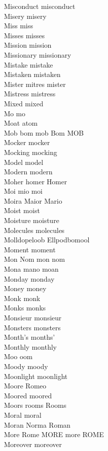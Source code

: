 Misconduct misconduct\\
Misery misery\\
Miss miss\\
Misses misses\\
Mission mission\\
Missionary missionary\\
Mistake mistake\\
Mistaken mistaken\\
Mister mitres mister\\
Mistress mistress\\
Mixed mixed\\
Mo mo\\
Moat atom\\
Mob bom mob Bom MOB\\
Mocker mocker\\
Mocking mocking\\
Model model\\
Modern modern\\
Moher homer Homer\\
Moi mio moi\\
Moira Maior Mario\\
Moist moist\\
Moisture moisture\\
Molecules molecules\\
Molldopeloob Ellpodbomool\\
Moment moment\\
Mon Nom mon nom\\
Mona mano moan\\
Monday monday\\
Money money\\
Monk monk\\
Monks monks\\
Monsieur monsieur\\
Monsters monsters\\
Month's months'\\
Monthly monthly\\
Moo oom\\
Moody moody\\
Moonlight moonlight\\
Moore Romeo\\
Moored moored\\
Moors rooms Rooms\\
Moral moral\\
Moran Norma Roman\\
More Rome MORE more ROME\\
Moreover moreover\\
